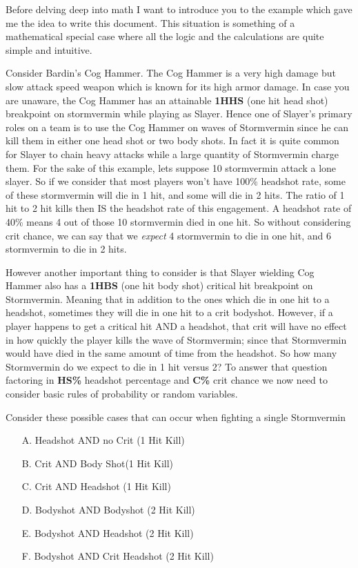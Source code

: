 \documentclass{article}
\begin{document}
\par

Before delving deep into math I want to introduce you to the example which gave me the idea to write this document. This situation is something of a mathematical special case where all the logic and the calculations are quite simple and intuitive.

Consider Bardin's Cog Hammer. The Cog Hammer is a very high damage but slow attack speed weapon which is known for its high armor damage. In case you are unaware, the Cog Hammer has an attainable \textbf{1HHS} (one hit head shot) breakpoint on stormvermin while playing as Slayer. Hence one of Slayer's primary roles on a team is to use the Cog Hammer on waves of Stormvermin since he can kill them in either one head shot or two body shots. In fact it is quite common for Slayer to chain heavy attacks while a large quantity of Stormvermin charge them. For the sake of this example, lets suppose 10 stormvermin attack a lone slayer. So if we consider that most players won't have 100\% headshot rate, some of these stormvermin will die in 1 hit, and some will die in 2 hits. The ratio of 1 hit to 2 hit kills then IS the headshot rate of this engagement. A headshot rate of 40\% means 4 out of those 10 stormvermin died in one hit. So without considering crit chance, we can say that we \emph{expect} 4 stormvermin to die in one hit, and 6 stormvermin to die in 2 hits.

However another important thing to consider is that Slayer wielding Cog Hammer also has a \textbf{1HBS} (one hit body shot) critical hit breakpoint on Stormvermin. Meaning that in addition to the ones which die in one hit to a headshot, sometimes they will die in one hit to a crit bodyshot. However, if a player happens to get a critical hit AND a headshot, that crit will have no effect in how quickly the player kills the wave of Stormvermin; since that Stormvermin would have died in the same amount of time from the headshot. So how many Stormvermin do we expect to die in 1 hit versus 2? To answer that question factoring in \textbf{HS\%} headshot percentage and \textbf{C\%} crit chance we now need to consider basic rules of probability or random variables.

Consider these possible cases that can occur when fighting a single Stormvermin
\begin{enumerate}
\item[A.] Headshot AND no Crit (1 Hit Kill)
\item[B.] Crit AND Body Shot(1 Hit Kill)
\item[C.] Crit AND Headshot (1 Hit Kill)
\item[D.] Bodyshot AND Bodyshot (2 Hit Kill)
\item[E.] Bodyshot AND Headshot (2 Hit Kill)
\item[F.] Bodyshot AND Crit Headshot (2 Hit Kill)
\end{enumerate}
\end{document}
